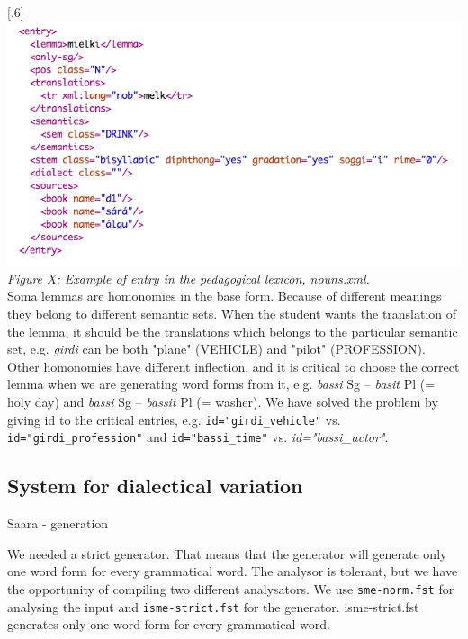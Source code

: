 \documentclass[a4paper,12pt]{article}
\begin{document}
\scalebox{.6}[.6]{\includegraphics{img/nounlexicon.png}}\\
\textit{Figure X: Example of entry in the pedagogical lexicon, nouns.xml.}\\

Soma lemmas are homonomies in the base form. Because of different meanings they belong to different semantic sets. When the student wants the translation of the lemma, it should be the translations which belongs to the particular semantic set, e.g. \textit{girdi} can be both "plane" (VEHICLE) and "pilot" (PROFESSION). Other homonomies have different inflection, and it is critical to choose the correct lemma when we are generating word forms from it, e.g. \textit{bassi} Sg -- \textit{basit} Pl (= holy day) and \textit{bassi} Sg -- \textit{bassit} Pl (= washer). We have solved the problem by giving id to the critical entries, e.g. \texttt{id="girdi\_vehicle"} vs. 
\texttt{id="girdi\_profession"} and \texttt{id="bassi\_time"} vs. \textit{id="bassi\_actor"}.


\subsection{System for dialectical variation}
Saara - generation

We needed a strict generator. That means that the generator will generate only one word form for every grammatical word. The analysor is tolerant, but we have the opportunity of compiling two different analysators. We use \texttt{sme-norm.fst} for analysing the input and \texttt{isme-strict.fst} for the generator. isme-strict.fst generates only one word form for every grammatical word.
\end{document}
